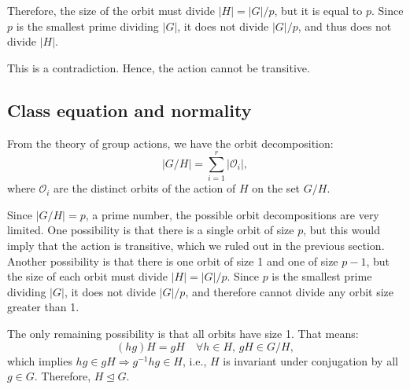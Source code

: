 \documentclass[12pt]{article}
\begin{document}
Therefore, the size of the orbit must divide \( |H| = |G|/p \), but it is equal to \( p \). Since \( p \) is the smallest prime dividing \( |G| \), it does not divide \( |G|/p \), and thus does not divide \( |H| \).

This is a contradiction. Hence, the action cannot be transitive.

\subsection*{Class equation and normality}

From the theory of group actions, we have the orbit decomposition:
\[
|G/H| = \sum_{i=1}^r |\mathcal{O}_i|,
\]
where \( \mathcal{O}_i \) are the distinct orbits of the action of \( H \) on the set \( G/H \).

Since \( |G/H| = p \), a prime number, the possible orbit decompositions are very limited. One possibility is that there is a single orbit of size \( p \), but this would imply that the action is transitive, which we ruled out in the previous section. Another possibility is that there is one orbit of size 1 and one of size \( p - 1 \), but the size of each orbit must divide \( |H| = |G|/p \). Since \( p \) is the smallest prime dividing \( |G| \), it does not divide \( |G|/p \), and therefore cannot divide any orbit size greater than 1.

The only remaining possibility is that all orbits have size 1. That means:
\[
(hg)H = gH \quad \forall h \in H,\, gH \in G/H,
\]
which implies \( hg \in gH \Rightarrow g^{-1}hg \in H \), i.e., \( H \) is invariant under conjugation by all \( g \in G \). Therefore, \( H \trianglelefteq G \).
\end{document}
